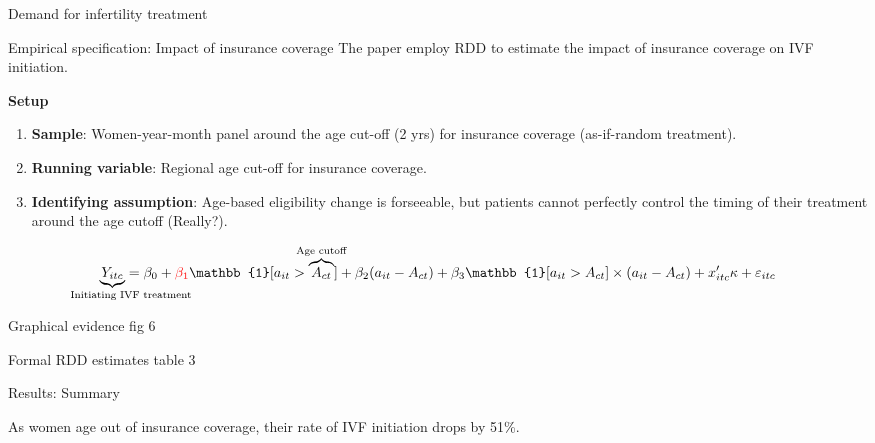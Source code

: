 \documentclass[notes,11pt, aspectratio=169]{beamer}
\newenvironment{wideitemize}{\itemize\addtolength{\itemsep}{0.4em}}{\enditemize}
\begin{document}
\begin{frame}
	\begin{center}
		\huge{Demand for infertility treatment}
	\end{center}
\end{frame}

\begin{frame}{Empirical specification: Impact of insurance coverage}
	The paper employ RDD to estimate the impact of insurance coverage on IVF initiation.\vspace{1em}

	\begin{block}{\textbf{Setup}}
		\begin{enumerate}
			\item \textbf{Sample}: Women-year-month panel around the age cut-off (2 yrs) for insurance coverage (as-if-random treatment).	
			\item \textbf{Running variable}: Regional age cut-off for insurance coverage.
			\item \textbf{Identifying assumption}: Age-based eligibility change is forseeable, but patients cannot perfectly control the timing of their treatment around the age cutoff (Really?).
		\end{enumerate}
	
	\end{block}

	\begin{align}
		\underbrace{Y_{itc}}_{\hidewidth \text{\hspace{3em} Initiating IVF treatment} \hidewidth} = \beta_0 + \textcolor{red}{\beta_1}\mathbb{1} [ a_{it} > \overbrace{A_{ct}}^{\hidewidth \text{Age cutoff} \hidewidth} ] + \beta_2 (a_{it} - A_{ct}) + \beta_3 \mathbb{1} [a_{it} > A_{ct}] \times (a_{it} - A_{ct}) + x'_{itc} \kappa + \varepsilon_{itc}\nonumber
	\end{align}
\end{frame}

\begin{frame}{Graphical evidence}
	fig 6	
\end{frame}

\begin{frame}{Formal RDD estimates}
table 3	
\end{frame}

\begin{frame}{Results: Summary}
\begin{wideitemize}
\item As women age out of insurance coverage, their rate of IVF initiation drops by 51\%. 

\end{wideitemize}	
\end{frame}
\end{document}
